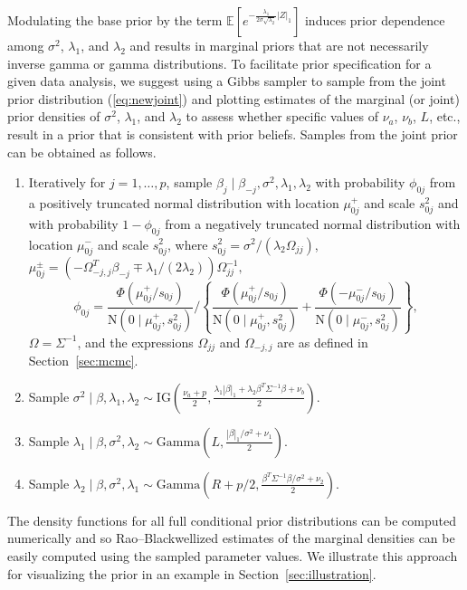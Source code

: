 \documentclass[12pt]{article}
\begin{document}
Modulating the base prior by the term 
$\mathbb{E}\left[e^{-\frac{\lambda_1}{2\sigma\sqrt{\lambda_2}}|Z|_1}\right]$ induces
prior dependence among $\sigma^2$, $\lambda_1$, and $\lambda_2$ and results in
marginal priors that are not necessarily inverse gamma or gamma distributions. To
facilitate prior specification for a given data analysis, we suggest using a Gibbs
sampler to sample from the joint prior distribution (\ref{eq:newjoint}) and 
plotting estimates of the marginal (or joint) prior densities of $\sigma^2$,
$\lambda_1$, and $\lambda_2$ to assess whether 
specific values of $\nu_a$, $\nu_b$, $L$, etc., result in a prior that is consistent 
with prior beliefs.  Samples from the joint prior can be obtained as follows.
\begin{enumerate}
\item Iteratively for $j=1, \ldots, p$, sample 
$\beta_j \mid \beta_{-j}, \sigma^2, \lambda_1, \lambda_2$ with probability
$\phi_{0j}$ from a positively truncated normal distribution with location $\mu_{0j}^+$
and scale $s^2_{0j}$ and with probability $1-\phi_{0j}$ from a negatively truncated
normal distribution with location $\mu_{0j}^-$ and scale $s^2_{0j}$, where
$s_{0j}^2 = \sigma^2/(\lambda_2 \Omega_{jj})$,
$
	\mu_{0j}^{\pm} = (-\Omega^T_{-j,j}\beta_{-j} \mp 
	\lambda_1 /(2\lambda_2))\Omega_{jj}^{-1},
$
\[
	\phi_{0j} = \frac{\Phi(\mu_{0j}^+/s_{0j})}{\mbox{N}(0 \mid \mu_{0j}^+,
		s^2_{0j})} \Big/ \left\{ \frac{\Phi(\mu_{0j}^+/s_{0j})}{\mbox{N}(0 \mid \mu_{0j}^+,
		s_{0j}^2)} + \frac{\Phi(-\mu_{0j}^-/s_{0j})}{\mbox{N}(0 \mid \mu_{0j}^-,
		s_{0j}^2)}\right\},
\]
$\Omega = \Sigma^{-1}$, and the expressions $\Omega_{jj}$ and $\Omega_{-j,j}$ are
as defined in Section~\ref{sec:mcmc}.
\item Sample $\sigma^2 \mid \beta, \lambda_1, \lambda_2 \sim 
\mbox{IG}\left(\frac{\nu_a + p}{2}, 
\frac{\lambda_1 |\beta|_1 + \lambda_2 \beta^T \Sigma^{-1} \beta + \nu_b}{2} \right)$.
\item Sample $\lambda_1 \mid \beta, \sigma^2, \lambda_2 \sim \mbox{Gamma}\left(
L, \frac{|\beta|_1/\sigma^2 + \nu_1}{2}\right)$. \label{it:lam1fullcon}
\item Sample $\lambda_2 \mid \beta, \sigma^2, \lambda_1 \sim \mbox{Gamma}\left(
R + p/2, \frac{\beta^T \Sigma^{-1} \beta/\sigma^2 + \nu_2}{2}\right)$.
\label{it:lam2fullcon}
\end{enumerate}
The density functions for all full conditional prior distributions can be computed
numerically and so Rao--Blackwellized estimates of the marginal densities can be
easily computed using the sampled parameter values. We illustrate this approach
for visualizing the prior in an example in Section~\ref{sec:illustration}.
\end{document}
